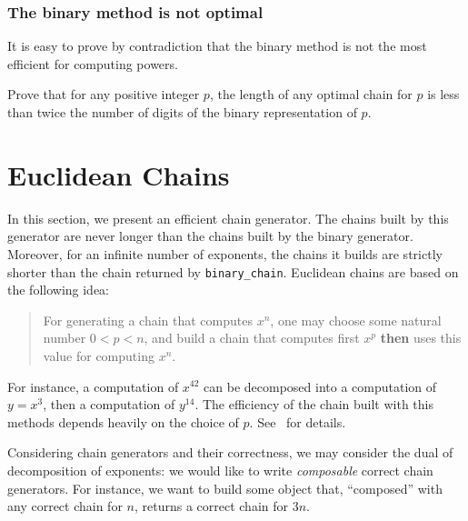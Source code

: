 
\subsubsection{The binary method is not optimal}

It is easy to prove by contradiction  that the binary method is not the most efficient 
for computing powers. 


\begin{exercise}
Prove that for any positive integer $p$,  the length of any optimal chain 
for $p$ is less  than twice the number of digits of the binary representation of $p$.
\end{exercise}


\section{Euclidean Chains}
\label{euclide-sect}
In this section, we present an efficient chain generator. The chains built by this generator
are never longer than the chains built by the binary generator. Moreover, for an 
infinite number of exponents, the chains it builds are strictly shorter than the chain
returned by \texttt{binary\_chain}. 
Euclidean chains are based on the following idea: 
\begin{quote}
For generating a chain that computes $x^n$, one may choose some natural number
$0<p<n$, and build a chain that computes first $x^p$ \textbf{then} uses this value
for computing $x^n$. 
\end{quote}

For instance, a  computation of $x^{42}$ can be decomposed into a computation 
of $y=x^3$, then a computation of $y^{14}$. The efficiency of the chain built with this
methods depends heavily on the choice of $p$. See~\cite{DBLP:journals/ita/BrlekCHM95} for details.

Considering chain generators and their correctness, we may consider the dual of 
decomposition of exponents: we would like to write \emph{composable} correct 
chain generators. For instance, we want to build some object that, ``composed''  
with any correct chain for $n$, returns a correct chain for $3n$.

